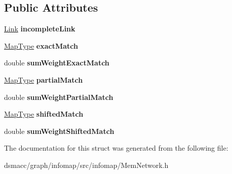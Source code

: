 \subsection*{Public Attributes}
\begin{DoxyCompactItemize}
\item 
\mbox{\label{structComplementaryData_ac42e33a72f1126a659e7257e71af4b89}} 
\mbox{\hyperlink{structLink}{Link}} {\bfseries incomplete\+Link}
\item 
\mbox{\label{structComplementaryData_ac403de74888d21ec39c6d1e43bb56c56}} 
\mbox{\hyperlink{classEasyMap}{Map\+Type}} {\bfseries exact\+Match}
\item 
\mbox{\label{structComplementaryData_aaae562a709279d814b6c329db6db656f}} 
double {\bfseries sum\+Weight\+Exact\+Match}
\item 
\mbox{\label{structComplementaryData_a35ba00f7eb78a1c1d1ee1db20e529bb8}} 
\mbox{\hyperlink{classEasyMap}{Map\+Type}} {\bfseries partial\+Match}
\item 
\mbox{\label{structComplementaryData_aea8445fd7189df60ff2d8b5698dbffa5}} 
double {\bfseries sum\+Weight\+Partial\+Match}
\item 
\mbox{\label{structComplementaryData_a038f576bfc80705cffd57a1068b80967}} 
\mbox{\hyperlink{classEasyMap}{Map\+Type}} {\bfseries shifted\+Match}
\item 
\mbox{\label{structComplementaryData_a5f007fe305e3e1c698b7ed73f95926d3}} 
double {\bfseries sum\+Weight\+Shifted\+Match}
\end{DoxyCompactItemize}


The documentation for this struct was generated from the following file\+:\begin{DoxyCompactItemize}
\item 
dsmacc/graph/infomap/src/infomap/Mem\+Network.\+h\end{DoxyCompactItemize}
